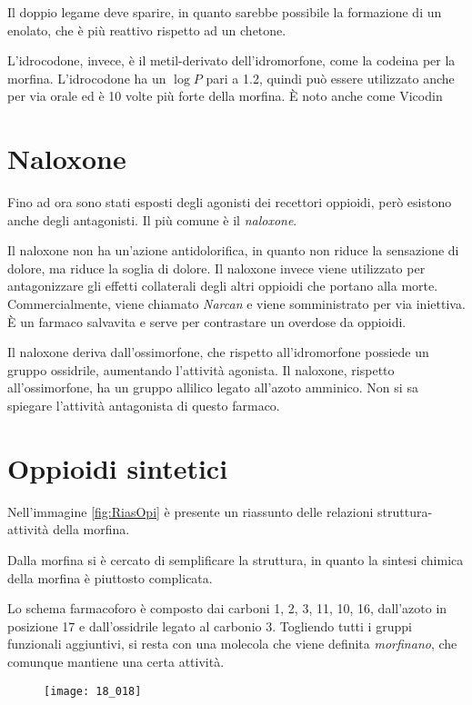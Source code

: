 Il doppio legame deve sparire, in quanto sarebbe possibile la formazione
di un enolato, che è più reattivo rispetto ad un
chetone.

L'idrocodone, invece, è il metil-derivato dell'idromorfone, come la
codeina per la morfina. L'idrocodone ha un \(\log{} P\) pari a 1.2,
quindi può essere utilizzato anche per via orale ed è 10 volte più forte
della morfina. È noto anche come Vicodin

\section{Naloxone}

Fino ad ora sono stati esposti degli agonisti dei recettori oppioidi,
però esistono anche degli antagonisti. Il più comune è il
\emph{naloxone}.

Il naloxone non ha un'azione antidolorifica, in quanto non riduce la
sensazione di dolore, ma riduce la soglia di dolore. Il naloxone invece
viene utilizzato per antagonizzare gli effetti collaterali degli altri
oppioidi che portano alla morte. Commercialmente, viene chiamato
\emph{Narcan} e viene somministrato per via iniettiva. È un farmaco
salvavita e serve per contrastare un overdose da oppioidi.

Il naloxone deriva dall'ossimorfone, che rispetto all'idromorfone
possiede un gruppo ossidrile, aumentando l'attività agonista. Il
naloxone, rispetto all'ossimorfone, ha un gruppo allilico legato
all'azoto amminico. Non si sa spiegare l'attività antagonista di questo
farmaco.

\section{Oppioidi sintetici}


Nell'immagine \ref{fig:RiasOpi} è presente un riassunto delle relazioni struttura-attività
della morfina.

Dalla morfina si è cercato di semplificare la struttura, in quanto la
sintesi chimica della morfina è piuttosto complicata.

Lo schema farmacoforo è composto dai carboni 1, 2, 3, 11, 10, 16,
dall'azoto in posizione 17 e dall'ossidrile legato al carbonio 3.
Togliendo tutti i gruppi funzionali aggiuntivi, si resta con una
molecola che viene definita \emph{morfinano}, che comunque mantiene una
certa attività.
\begin{figure}[H]
  \centering
  \texttt{[image: 18\_018]}
\end{figure}


